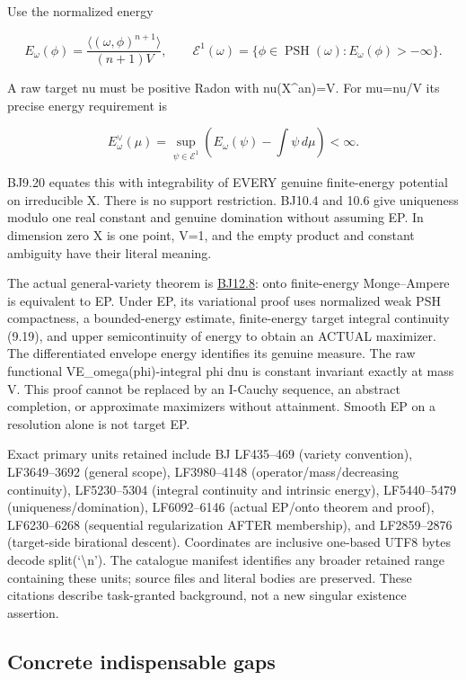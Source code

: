 \documentclass[
  10pt,
]{article}
\begin{document}
Use the normalized energy

\[
 E_\omega(\phi)=\frac{\langle(\omega,\phi)^{n+1}\rangle}{(n+1)V},
 \qquad\mathcal E^1(\omega)=\{\phi\in\operatorname{PSH}(\omega):E_\omega(\phi)>-\infty\}.
\]

A raw target nu must be positive Radon with nu(X\^{}an)=V. For mu=nu/V
its precise energy requirement is

\[
 E_\omega^\vee(\mu)=\sup_{\psi\in\mathcal E^1}
       \left(E_\omega(\psi)-\int\psi\,d\mu\right)<\infty.
\]

BJ9.20 equates this with integrability of EVERY genuine finite-energy
potential on irreducible X. There is no support restriction. BJ10.4 and
10.6 give uniqueness modulo one real constant and genuine domination
without assuming EP. In dimension zero X is one point, V=1, and the
empty product and constant ambiguity have their literal meaning.

The actual general-variety theorem is
\href{https://arxiv.org/pdf/1801.08229v4\#page=121}{BJ12.8}: onto
finite-energy Monge--Ampere is equivalent to EP. Under EP, its
variational proof uses normalized weak PSH compactness, a bounded-energy
estimate, finite-energy target integral continuity (9.19), and upper
semicontinuity of energy to obtain an ACTUAL maximizer. The
differentiated envelope energy identifies its genuine measure. The raw
functional VE\_omega(phi)-integral phi dnu is constant invariant exactly
at mass V. This proof cannot be replaced by an I-Cauchy sequence, an
abstract completion, or approximate maximizers without attainment.
Smooth EP on a resolution alone is not target EP.

Exact primary units retained include BJ LF435--469 (variety convention),
LF3649--3692 (general scope), LF3980--4148 (operator/mass/decreasing
continuity), LF5230--5304 (integral continuity and intrinsic energy),
LF5440--5479 (uniqueness/domination), LF6092--6146 (actual EP/onto
theorem and proof), LF6230--6268 (sequential regularization AFTER
membership), and LF2859--2876 (target-side birational descent).
Coordinates are inclusive one-based UTF8 bytes decode
split(`\textbackslash n'). The catalogue manifest identifies any broader
retained range containing these units; source files and literal bodies
are preserved. These citations describe task-granted background, not a
new singular existence assertion.

\subsection{Concrete indispensable
gaps}\label{concrete-indispensable-gaps}
\end{document}
